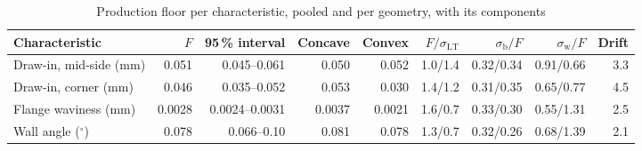 \documentclass[pdflatex,sn-basic,lineno]{sn-jnl}
\newcommand{\tabsize}{\fontsize{8}{9.5}\selectfont}
\providecommand{\DIFaddbeginFL}{} %
\providecommand{\DIFdelbeginFL}{} %
\providecommand{\DIFdelendFL}{} %
\newcommand{\DIFscaledelfig}{0.5}
\newlength{\DIFdelgraphicswidth} %
\newlength{\DIFdelgraphicsheight} %
\newcommand{\DIFaddincludegraphics}[2][]{{\color{blue}\fbox{\DIFOincludegraphics[#1]{#2}}}} %
\newcommand{\DIFdelincludegraphics}[2][]{%
\sbox{\DIFdelgraphicsbox}{\DIFOincludegraphics[#1]{#2}}%
\settoboxwidth{\DIFdelgraphicswidth}{\DIFdelgraphicsbox} %
\settoboxtotalheight{\DIFdelgraphicsheight}{\DIFdelgraphicsbox} %
\scalebox{\DIFscaledelfig}{%
\parbox[b]{\DIFdelgraphicswidth}{\usebox{\DIFdelgraphicsbox}\\[-\baselineskip] \rule{\DIFdelgraphicswidth}{0em}}\llap{\resizebox{\DIFdelgraphicswidth}{\DIFdelgraphicsheight}{%
\setlength{\unitlength}{\DIFdelgraphicswidth}%
\begin{picture}(1,1)%
\thicklines\linethickness{2pt} %
{\color[rgb]{1,0,0}\put(0,0){\framebox(1,1){}}}%
{\color[rgb]{1,0,0}\put(0,0){\line( 1,1){1}}}%
{\color[rgb]{1,0,0}\put(0,1){\line(1,-1){1}}}%
\end{picture}%
}\hspace*{3pt}}} %
} %
\DeclareRobustCommand{\DIFaddbeginFL}{\DIFOaddbeginFL \let\includegraphics\DIFaddincludegraphics} %
\DeclareRobustCommand{\DIFdelbeginFL}{\DIFOdelbeginFL \let\includegraphics\DIFdelincludegraphics} %
\DeclareRobustCommand{\DIFdelendFL}{\DIFOaddendFL \let\includegraphics\DIFOincludegraphics} %
\begin{document}
\begin{table}[t]
\tabsize
\setlength{\tabcolsep}{2.0pt}
\caption{Production floor per characteristic, pooled and per geometry, with its components}\label{tab:floors}
\DIFdelbeginFL %
\DIFdelendFL \DIFaddbeginFL \begin{tabular}{@{}lrrrrrrrr@{}}
\toprule
Characteristic & $F$ & 95\,\% interval & Concave & Convex & $F/\sigma_\mathrm{LT}$ & $\sigma_\mathrm{b}/F$ & $\sigma_\mathrm{w}/F$ & Drift \\
\midrule
Draw-in, mid-side (mm) & 0.051 & 0.045--0.061 & 0.050 & 0.052 & 1.0/1.4 & 0.32/0.34 & 0.91/0.66 & 3.3 \\
Draw-in, corner (mm) & 0.046 & 0.035--0.052 & 0.053 & 0.030 & 1.4/1.2 & 0.31/0.35 & 0.65/0.77 & 4.5 \\
Flange waviness (mm) & 0.0028 & 0.0024--0.0031 & 0.0037 & 0.0021 & 1.6/0.7 & 0.33/0.30 & 0.55/1.31 & 2.5 \\
Wall angle ($^\circ$) & 0.078 & 0.066--0.10 & 0.081 & 0.078 & 1.3/0.7 & 0.32/0.26 & 0.68/1.39 & 2.1 \\

\end{tabular}
\end{table}
\end{document}

